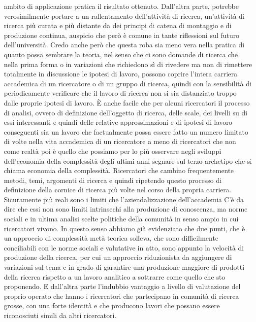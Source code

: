 \documentclass[a4paper, headings=standardclasses]{scrartcl}
\begin{document}
ambito di applicazione pratica il risultato ottenuto. Dall'altra parte, potrebbe verosimilmente
portare a un rallentamento dell'attività di ricerca, un'attività di ricerca più curata
e più distante da dei principi di catena di montaggio e di produzione continua,
auspicio che però è comune in tante riflessioni sul futuro dell'università. Credo anche però che
questa roba sia meno vera nella pratica di quanto possa sembrare la teoria, nel senso che ci sono
domande di ricerca che nella prima forma o in variazioni che richiedono sì di rivedere ma non
di rimettere totalmente in discussione le ipotesi di lavoro, possono coprire l'intera carriera
accademica di un ricercatore o di un gruppo di ricerca, quindi con la sensibilità di periodicamente
verificare che il lavoro di ricerca non si sia distanziato troppo dalle proprie ipotesi di lavoro.
È anche facile che per alcuni ricercatori il processo di analisi, ovvero di definizione dell'oggetto
di ricerca, delle scale, dei livelli su di essi interessanti e quindi delle relative
approssimazioni e di ipotesi di lavoro conseguenti sia un lavoro che factualmente possa essere fatto
un numero limitato di volte nella vita accademica di un ricercatore a meno di ricercatori che non
come realtà poi è quello che possiamo per lo più osservare negli sviluppi dell'economia
della complessità degli ultimi anni segnare sul terzo archetipo che si chiama economia della
complessità. Ricercatori che cambino frequentemente metodi, temi, argomenti di ricerca e quindi
ripetendo questo processo di definizione della cornice di ricerca più volte nel corso della
propria carriera. Sicuramente più reali sono i limiti che l'aziendalizzazione dell'accademia
C'è da dire che essi non sono limiti intrinsechi alla produzione di conoscenza, ma norme sociali
e in ultima analisi scelte politiche della comunità in senso ampio in cui ricercatori vivono.
In questo senso abbiamo già evidenziato che due punti, che è un approccio di complessità metà
teorica solleva, che sono difficilmente conciliabili con le norme sociali e valutative in atto,
sono appunto la velocità di produzione della ricerca, per cui un approccio riduzionista
da aggiungere di variazioni sul tema e in grado di garantire una produzione maggiore di prodotti
della ricerca rispetto a un lavoro analitico a sottrarre come quello che sto proponendo.
E dall'altra parte l'indubbio vantaggio a livello di valutazione del proprio operato che hanno i
ricercatori che partecipano in comunità di ricerca grosse, con una forte identità e che
producono lavori che possano essere riconosciuti simili da altri ricercatori.
\end{document}
